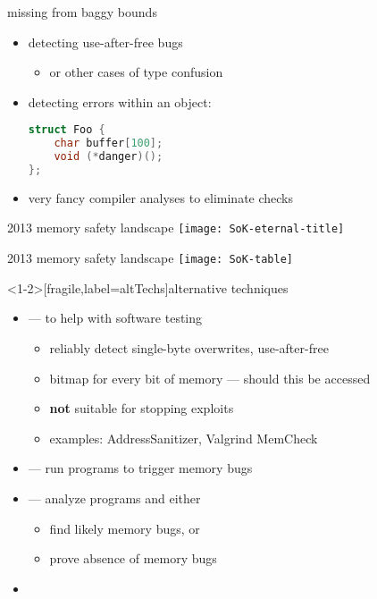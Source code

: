 \begin{frame}[fragile,label=missingBaggy]{missing from baggy bounds}
    \begin{itemize}
        \item detecting use-after-free bugs
            \begin{itemize}
                \item or other cases of type confusion
            \end{itemize}
        \item detecting errors within an object:
\begin{lstlisting}[language=C,style=small]
struct Foo {
    char buffer[100];
    void (*danger)();
};
\end{lstlisting}
        \item very fancy compiler analyses to eliminate checks
    \end{itemize}
\end{frame}

\begin{frame}{2013 memory safety landscape}
    \texttt{[image: SoK-eternal-title]}
\end{frame}

\begin{frame}{2013 memory safety landscape}
    \texttt{[image: SoK-table]}
\end{frame}

\begin{frame}<1-2>[fragile,label=altTechs]{alternative techniques}
    \begin{itemize}
        \item {} --- to help with software testing
            \begin{itemize}
            \item reliably detect single-byte overwrites, use-after-free
            \item bitmap for every bit of memory --- should this be accessed
            \item \textbf{not} suitable for stopping exploits
            \item examples: AddressSanitizer, Valgrind MemCheck
            \end{itemize}
        \item {} --- run programs to trigger memory bugs
        \item {} --- analyze programs and either
            \begin{itemize}
            \item find likely memory bugs, or
            \item prove absence of memory bugs
            \end{itemize}
        \item {}
    \end{itemize}
\end{frame}

